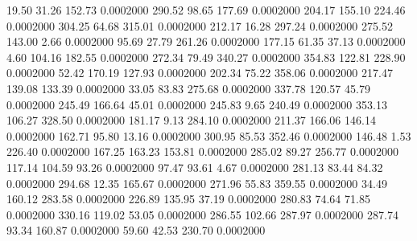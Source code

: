   19.50   31.26  152.73   0.0002000
 290.52   98.65  177.69   0.0002000
 204.17  155.10  224.46   0.0002000
 304.25   64.68  315.01   0.0002000
 212.17   16.28  297.24   0.0002000
 275.52  143.00    2.66   0.0002000
  95.69   27.79  261.26   0.0002000
 177.15   61.35   37.13   0.0002000
   4.60  104.16  182.55   0.0002000
 272.34   79.49  340.27   0.0002000
 354.83  122.81  228.90   0.0002000
  52.42  170.19  127.93   0.0002000
 202.34   75.22  358.06   0.0002000
 217.47  139.08  133.39   0.0002000
  33.05   83.83  275.68   0.0002000
 337.78  120.57   45.79   0.0002000
 245.49  166.64   45.01   0.0002000
 245.83    9.65  240.49   0.0002000
 353.13  106.27  328.50   0.0002000
 181.17    9.13  284.10   0.0002000
 211.37  166.06  146.14   0.0002000
 162.71   95.80   13.16   0.0002000
 300.95   85.53  352.46   0.0002000
 146.48    1.53  226.40   0.0002000
 167.25  163.23  153.81   0.0002000
 285.02   89.27  256.77   0.0002000
 117.14  104.59   93.26   0.0002000
  97.47   93.61    4.67   0.0002000
 281.13   83.44   84.32   0.0002000
 294.68   12.35  165.67   0.0002000
 271.96   55.83  359.55   0.0002000
  34.49  160.12  283.58   0.0002000
 226.89  135.95   37.19   0.0002000
 280.83   74.64   71.85   0.0002000
 330.16  119.02   53.05   0.0002000
 286.55  102.66  287.97   0.0002000
 287.74   93.34  160.87   0.0002000
  59.60   42.53  230.70   0.0002000
